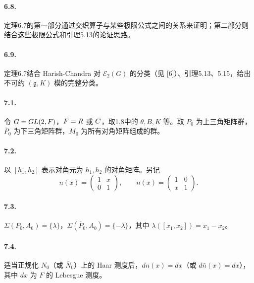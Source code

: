\paragraph*{6.8.} 定理6.7的第一部分通过交织算子与某些极限公式之间的关系来证明；第二部分则结合这些极限公式和引理5.13的论证思路。
\paragraph*{6.9.} 定理6.7结合 Harish-Chandra 对 $\mathcal E_2(G)$ 的分类（见 [6]）、引理5.13、5.15，给出不可约 $(\mathfrak g,K)$ 模的完整分类。

\paragraph*{7.1.} 令 $G=GL(2,F)$，$F=R$ 或 $C$，取1.8中的 $\theta,B,K$ 等。取 $P_0$ 为上三角矩阵群，$\overline P_0$ 为下三角矩阵群，$M_0$ 为所有对角矩阵组成的群。
\paragraph*{7.2.} 以 $[h_1,h_2]$ 表示对角元为 $h_1,h_2$ 的对角矩阵。另记
\[
 n(x)=\begin{pmatrix}1&x\\0&1\end{pmatrix},\qquad
 \bar n(x)=\begin{pmatrix}1&0\\x&1\end{pmatrix}.
\]
\paragraph*{7.3.} $\Sigma(P_0,A_0)=\{\lambda\}$，$\Sigma(\overline P_0,A_0)=\{-\lambda\}$，其中 $\lambda([x_1,x_2])=x_1-x_2$。
\paragraph*{7.4.} 适当正规化 $N_0$（或 $\overline N_0$）上的 Haar 测度后，$dn(x)=dx$（或 $d\bar n(x)=dx$），其中 $dx$ 为 $F$ 的 Lebesgue 测度。
